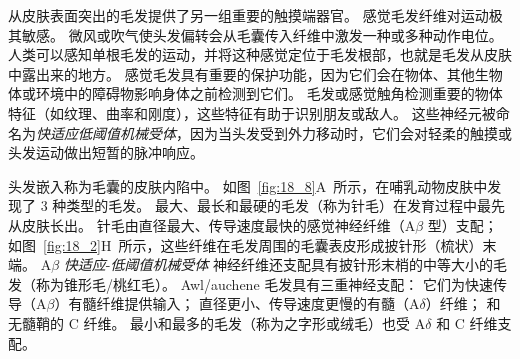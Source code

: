 从皮肤表面突出的毛发提供了另一组重要的触摸端器官。 
感觉毛发纤维对运动极其敏感。
微风或吹气使头发偏转会从毛囊传入纤维中激发一种或多种动作电位。
人类可以感知单根毛发的运动，并将这种感觉定位于毛发根部，也就是毛发从皮肤中露出来的地方。
感觉毛发具有重要的保护功能，因为它们会在物体、其他生物体或环境中的障碍物影响身体之前检测到它们。
毛发或感觉触角检测重要的物体特征（如纹理、曲率和刚度），这些特征有助于识别朋友或敌人。
这些神经元被命名为\textit{快适应低阈值机械受体}，因为当头发受到外力移动时，它们会对轻柔的触摸或头发运动做出短暂的脉冲响应。


头发嵌入称为毛囊的皮肤内陷中。
如图~\ref{fig:18_8}A~所示，在哺乳动物皮肤中发现了 3 种类型的毛发。
最大、最长和最硬的毛发（称为针毛）在发育过程中最先从皮肤长出。
针毛由直径最大、传导速度最快的感觉神经纤维（A$\beta$ 型）支配；
如图~\ref{fig:18_2}H~所示，这些纤维在毛发周围的毛囊表皮形成披针形（梳状）末端。
A$\beta$ \textit{快适应}-\textit{低阈值机械受体} 神经纤维还支配具有披针形末梢的中等大小的毛发（称为锥形毛/桃红毛）。
Awl/auchene 毛发具有三重神经支配：
它们为快速传导（A$\beta$）有髓纤维提供输入；
直径更小、传导速度更慢的有髓（A$\delta$）纤维；
和无髓鞘的 C 纤维。
最小和最多的毛发（称为之字形或绒毛）也受 A$\delta$ 和 C 纤维支配。


